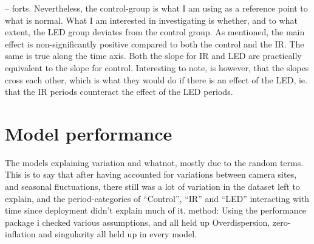 		-- forts. %
Nevertheless, the control-group is what I am using as a reference point to what is normal. What I am interested in investigating is whether, and to what extent, the LED group deviates from the control group.
As mentioned, the main effect is non-significantly positive compared to both the control and the IR. The same is true along the time axis. Both the slope for IR and LED are practically equivalent to the slope for control. Interesting to note, is however, that the slopes cross each other, which is what they would do if there is an effect of the LED, ie. that the IR periods counteract the effect of the LED periods.

\section{Model performance} %
The models explaining variation and whatnot, mostly due to the random terms. This is to say that after having accounted for variations between camera sites, and seasonal fluctuations, there still was a lot of variation in the dataset left to explain, and the period-categories of “Control”, “IR” and “LED” interacting with time since deployment didn’t explain much of it.
method:
Using the performance package i checked various assumptions, and all held up Overdispersion, zero-inflation and singularity all held up in every model.




%
%
%







